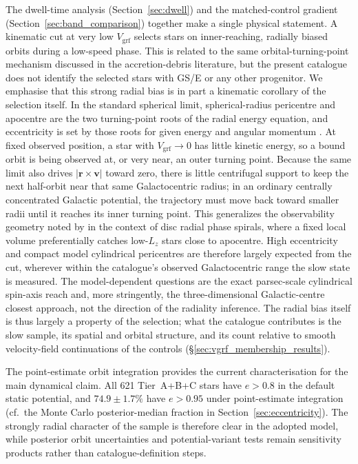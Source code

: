 \documentclass{aa}  %
\newcommand{\vgrf}{\ensuremath{V_{\mathrm{grf}}}\xspace}
\begin{document}
The dwell-time analysis (Section~\ref{sec:dwell}) and the
matched-control gradient (Section~\ref{sec:band_comparison}) together
make a single physical statement.  A kinematic cut at very low $\vgrf$
selects stars on inner-reaching, radially biased orbits during a
low-speed phase.  This is related to the same orbital-turning-point
mechanism discussed in the accretion-debris literature, but the present
catalogue does not identify the selected stars with GS/E or any other
progenitor.  We emphasise that this strong radial bias is in part a
 kinematic corollary of the selection itself.  In the standard spherical
 limit, spherical-radius pericentre and apocentre are the two turning-point roots of
the radial energy equation, and eccentricity is set by those roots for
given energy and angular momentum \citep{BinneyTremaine2008,
HattoriYoshii2010,HattoriYoshii2011}.  At fixed observed position, a
star with $\vgrf \to 0$ has little kinetic energy, so a bound orbit is
being observed at, or very near, an outer turning point.  Because the same
limit also drives $|\mathbf{r}\times\mathbf{v}|$ toward zero, there is
little centrifugal support to keep the next half-orbit near that same
Galactocentric radius; in an ordinary centrally concentrated Galactic
potential, the trajectory must move back toward smaller radii until it
reaches its inner turning point.  This generalizes the observability
geometry noted by \citet{Hunt2024} in the context of disc radial phase
spirals, where a fixed local volume preferentially catches low-$L_z$
 stars close to apocentre.  High eccentricity and compact model
 cylindrical pericentres are therefore largely expected from the cut, wherever within
the catalogue's observed Galactocentric range the slow state is measured.
 The model-dependent questions are the exact parsec-scale cylindrical
 spin-axis reach and, more stringently, the three-dimensional Galactic-centre
 closest approach, not the direction of the radiality inference.  The radial bias itself is
thus largely a property of the selection; what the catalogue contributes is
the slow sample, its spatial and orbital structure, and its count relative
to smooth velocity-field continuations of the controls
(\S\ref{sec:vgrf_membership_results}).

The point-estimate orbit integration provides the current
characterisation for the main dynamical claim.  All 621 Tier~A+B+C
stars have $e>0.8$ in the default static potential, and $74.9\pm 1.7\%$
have $e>0.95$ under point-estimate integration (cf.\ the Monte Carlo
posterior-median fraction in Section~\ref{sec:eccentricity}).  The strongly radial
character of the sample is therefore clear in the adopted model, while
posterior orbit uncertainties and potential-variant tests remain
sensitivity products rather than catalogue-definition steps.
\end{document}
